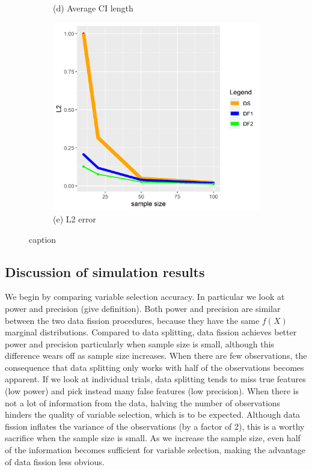 \begin{figure}[ht!]
\begin{subfigure}[b]{.32\columnwidth}
    \caption{(d) Average CI length}
\end{subfigure}
\hfill
\centering
\begin{subfigure}[b]{.32\columnwidth} 
    \includegraphics[width=\columnwidth]{../../plot/L2_1.png}
    \caption{(e) L2 error}
\end{subfigure}
\hfill
\caption{caption}
\label{fig:median}
\end{figure}

\subsection{Discussion of simulation results}

We begin by comparing variable selection accuracy. In particular we look at power and precision (give definition). Both power and precision are similar between the two data fission procedures, because they have the same $f(X)$ marginal distributions. Compared to data splitting, data fission achieves better power and precision particularly when sample size is small, although this difference wears off as sample size increases. When there are few observations, the consequence that data splitting only works with half of the observations becomes apparent. If we look at individual trials, data splitting tends to miss true features (low power) and pick instead many false features (low precision). When there is not a lot of information from the data, halving the number of observations hinders the quality of variable selection, which is to be expected. Although data fission inflates the variance of the observations (by a factor of 2), this is a worthy sacrifice when the sample size is small. As we increase the sample size, even half of the information becomes sufficient for variable selection, making the advantage of data fission less obvious.

